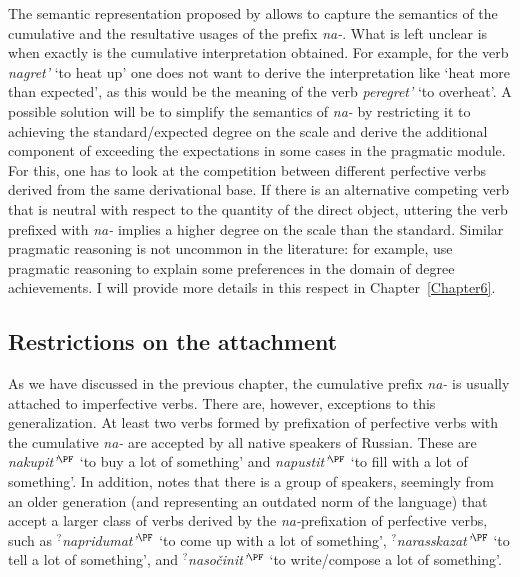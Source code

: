 The semantic representation proposed by \citet{Kagan:book} allows to capture the semantics of the cumulative and the resultative usages of the prefix \textit{na-}. What is left unclear is when exactly is the cumulative interpretation obtained. For example, for the verb \textit{nagret'} `to heat up' one does not want to derive the interpretation like `heat more than expected', as this would be the meaning of the verb \textit{peregret'} `to overheat'. A possible solution will be to simplify the semantics of \textit{na-} by restricting it to achieving the standard/expected degree on the scale and derive the additional component of exceeding the expectations in some cases in the pragmatic module. For this, one has to look at the competition between different perfective verbs derived from the same derivational base. If there is an alternative competing verb that is neutral with respect to the quantity of the direct object, uttering the verb prefixed with \textit{na-} implies a higher degree on the scale than the standard. Similar pragmatic reasoning is not uncommon in the literature: for example, \citet[21]{KennedyLevin:08} use pragmatic reasoning to explain some preferences in the domain of degree achievements. I will provide more details in this respect in Chapter~\ref{Chapter6}.

\subsection{Restrictions on the attachment}
As we have discussed in the previous chapter, the cumulative prefix \textit{na-} is usually attached to imperfective verbs. There are, however, exceptions to this generalization. At least two verbs formed by prefixation of perfective verbs with the cumulative \textit{na-} are accepted by all native speakers of Russian. These are \textit{nakupit'}$^{\PF}$ `to buy a lot of something' and \textit{napustit'}$^{\PF}$ `to fill with a lot of something'. In addition, \citet{Tatevosov:13a} notes that there is a group of speakers, seemingly from an older generation (and representing an outdated norm of the language) that accept a larger class of verbs derived by the \textit{na-}prefixation of perfective verbs, such as \textit{$^?$napridumat'}$^{\PF}$ `to come up with a lot of something', \textit{$^?$narasskazat'}$^{\PF}$ `to tell a lot of something', and \textit{$^?$naso\v{c}init'}$^{\PF}$ `to write/compose a lot of something'.

